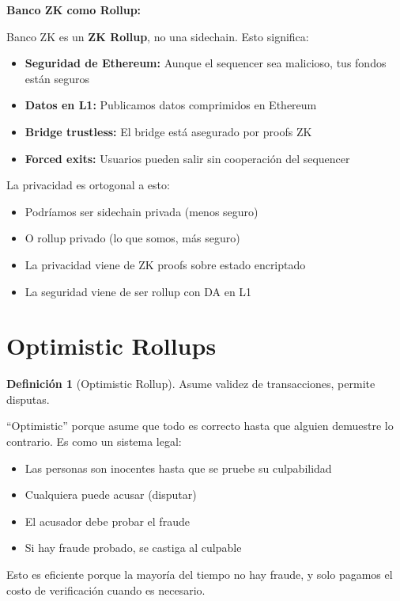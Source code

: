 \documentclass[11pt,a4paper,twoside,openright]{book}
\theoremstyle{definition}
\newtheorem{definition}{Definición}[chapter]
\theoremstyle{plain}
\theoremstyle{remark}
\begin{document}
\begin{bancozk}
\textbf{Banco ZK como Rollup:}

Banco ZK es un \textbf{ZK Rollup}, no una sidechain. Esto significa:

\begin{itemize}
    \item \textbf{Seguridad de Ethereum:} Aunque el sequencer sea malicioso, tus fondos están seguros
    \item \textbf{Datos en L1:} Publicamos datos comprimidos en Ethereum
    \item \textbf{Bridge trustless:} El bridge está asegurado por proofs ZK
    \item \textbf{Forced exits:} Usuarios pueden salir sin cooperación del sequencer
\end{itemize}

La privacidad es ortogonal a esto:
\begin{itemize}
    \item Podríamos ser sidechain privada (menos seguro)
    \item O rollup privado (lo que somos, más seguro)
    \item La privacidad viene de ZK proofs sobre estado encriptado
    \item La seguridad viene de ser rollup con DA en L1
\end{itemize}
\end{bancozk}


\section{Optimistic Rollups}

\begin{definition}[Optimistic Rollup]
Asume validez de transacciones, permite disputas.
\end{definition}

\begin{intuicion}
``Optimistic'' porque asume que todo es correcto hasta que alguien demuestre lo contrario. Es como un sistema legal:
\begin{itemize}
    \item Las personas son inocentes hasta que se pruebe su culpabilidad
    \item Cualquiera puede acusar (disputar)
    \item El acusador debe probar el fraude
    \item Si hay fraude probado, se castiga al culpable
\end{itemize}

Esto es eficiente porque la mayoría del tiempo no hay fraude, y solo pagamos el costo de verificación cuando es necesario.
\end{intuicion}
\end{document}
